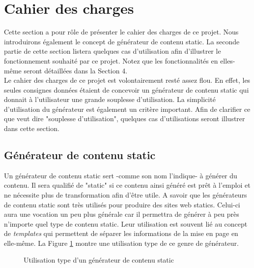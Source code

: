 \section{Cahier des charges}

	Cette section a pour rôle de présenter le cahier des charges de ce projet. Nous introduirons également le concept de générateur de contenu static. La seconde partie de cette section listera quelques cas d'utilisation afin d'illustrer le fonctionnement souhaité par ce projet. Notez que les fonctionnalités en elles-même seront détaillées dans la Section 4.\\
	
	Le cahier des charges de ce projet est volontairement resté assez flou. En effet, les seules consignes données étaient de concevoir un générateur de contenu static qui donnait à l'utilisateur une grande souplesse d'utilisation. La simplicité d'utilisation du générateur est également un critère important. Afin de clarifier ce que veut dire "souplesse d'utilisation", quelques cas d'utilisations seront illustrer dans cette section.\\
	
	
	\subsection{Générateur de contenu static}
	
		Un générateur de contenu static sert -comme son nom l'indique- à générer du contenu. Il sera qualifié de "static" si ce contenu ainsi généré est prêt à l'emploi et ne nécessite plus de transformation afin d'être utile. A savoir que les générateurs de contenu static sont très utilisés pour produire des sites web statics. Celui-ci aura une vocation un peu plus générale car il permettra de générer à peu près n'importe quel type de contenu static. Leur utilisation est souvent lié au concept de \textit{templates} qui permettent de séparer les informations de la mise en page en elle-même. La Figure \ref{fig:use_of_generator} montre une utilisation type de ce genre de générateur.\\
		
		\begin{figure}
			\begin{center}
			\caption{Utilisation type d'un générateur de contenu static}
			\label{fig:use_of_generator}
			\end{center}
		\end{figure}

